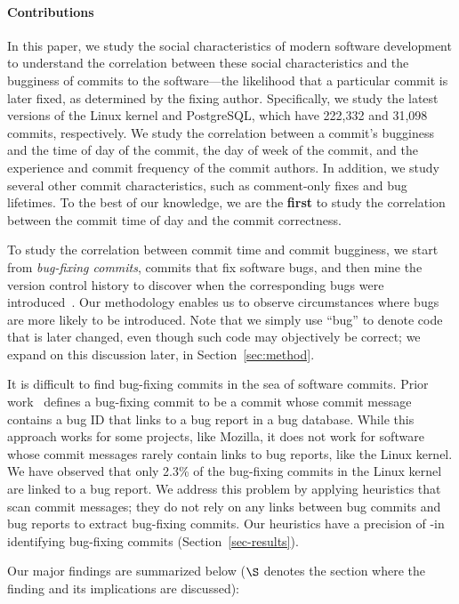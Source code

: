 \paragraph{Contributions}

In this paper, we study the social characteristics of modern software
development to understand the correlation between these social characteristics
and the bugginess of commits to the software---the likelihood that a
particular commit is later fixed, as determined by the fixing author.
Specifically, we study the latest versions of the Linux kernel and PostgreSQL,
which have 222,332 and 31,098 commits, respectively. We study the correlation
between a commit's bugginess and the time of day of the commit, the day of week
of the commit, and the experience and commit frequency of the commit authors.
In addition, we study several other commit characteristics, such as comment-only
fixes and bug lifetimes. To the best of our knowledge, we are the {\bf first}
to study the correlation between the commit time of day and the commit
correctness.

To study the correlation between commit time and commit bugginess, we start from
{\em bug-fixing commits}, commits that fix software bugs, and then mine the
version control history to discover when the corresponding bugs were
introduced~\cite{sliwerski-msr-2005}. Our methodology enables us to observe
circumstances where bugs are more likely to be introduced. Note that we simply use ``bug'' to
denote code that is later changed, even though such code may objectively be
correct; we expand on this discussion later, in Section~\ref{sec:method}.

It is difficult to find bug-fixing commits in the sea of software commits.
Prior work~\cite{sliwerski-msr-2005} defines a bug-fixing commit to be a commit
whose commit message contains a bug ID that links to a bug report in a bug
database. While this approach works for some projects, like Mozilla, it does not
work for software whose commit messages rarely contain links to bug reports,
like the Linux kernel. We have observed that only 2.3\% of the bug-fixing
commits in the Linux kernel are linked to a bug report. We address this problem
by applying heuristics that scan commit messages; they do not rely on any links
between bug commits and bug reports to extract bug-fixing commits. Our
heuristics have a precision of \postP-\linuxP in identifying bug-fixing commits
(Section~\ref{sec-results}).

Our major findings are summarized below ($\S$ denotes the section where the
finding and its implications are discussed):

